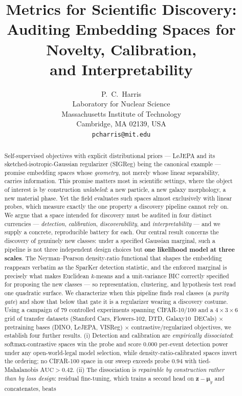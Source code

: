 \documentclass{article}
\title{Metrics for Scientific Discovery:\\
Auditing Embedding Spaces for Novelty, Calibration,\\
and Interpretability}
\author{
P.~C.~Harris\\
Laboratory for Nuclear Science\\
Massachusetts Institute of Technology\\
Cambridge, MA 02139, USA\\
\texttt{pcharris@mit.edu}
}
\date{}
\newcommand{\z}{\mathbf{z}}
\newcommand{\mmu}{\boldsymbol{\mu}}
\newcommand{\auc}{\mathrm{AUC}}
\begin{document}
\maketitle

\begin{abstract}
Self-supervised objectives with explicit distributional priors --- LeJEPA and
its sketched-isotropic-Gaussian regularizer (SIGReg) being the canonical
example --- promise embedding spaces whose \emph{geometry}, not merely whose
linear separability, carries information. This promise matters most in
scientific settings, where the object of interest is by construction
\emph{unlabeled}: a new particle, a new galaxy morphology, a new material
phase. Yet the field evaluates such spaces almost exclusively with linear
probes, which measure exactly the one property a discovery pipeline cannot
rely on. We argue that a space intended for discovery must be audited in four
distinct currencies --- \emph{detection}, \emph{calibration},
\emph{discoverability}, and \emph{interpretability} --- and we supply a
concrete, reproducible battery for each. Our central result concerns the
discovery of genuinely new classes: under a specified Gaussian marginal, such
a pipeline is not three independent design choices but \textbf{one likelihood
model at three scales}. The Neyman--Pearson density-ratio functional that
shapes the embedding reappears verbatim as the SparKer detection statistic,
and the enforced marginal is precisely what makes Euclidean $k$-means and a
unit-variance BIC correctly specified for proposing the new classes --- so
representation, clustering, and hypothesis test read one quadratic surface. We
characterize when this pipeline finds real classes (a \emph{purity gate}) and
show that below that gate it is a regularizer wearing a discovery costume.
Using a campaign of 79 controlled experiments spanning CIFAR-10/100 and a
$4\times3\times6$ grid of transfer datasets (Stanford Cars, Flowers-102, DTD,
Galaxy10~DECals) $\times$ pretraining bases (DINO, LeJEPA, VISReg) $\times$
contrastive/regularized objectives, we establish four further results. (i) Detection and calibration are
\emph{empirically dissociated}: softmax-contrastive spaces win the probe and
score $0.000$ per-event detection power under any open-world-legal model
selection, while density-ratio-calibrated
spaces invert the ordering; no CIFAR-100 space in our sweep exceeds probe
$0.94$ with tied-Mahalanobis $\auc>0.42$. (ii) The dissociation is
\emph{repairable by construction rather than by loss design}: residual
fine-tuning, which trains a second head on $\z-\mmu_y$ and concatenates, beats

\end{abstract}
\end{document}
